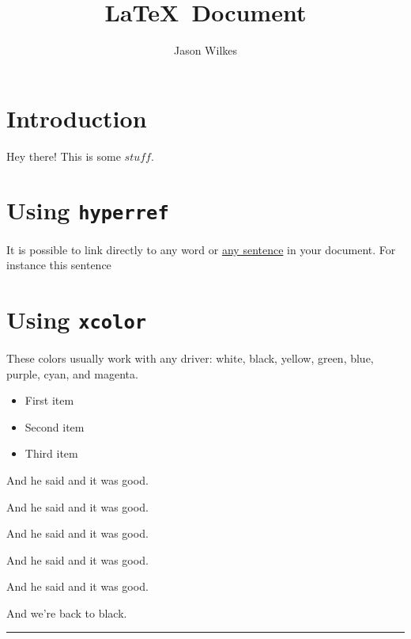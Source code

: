 \documentclass[12pt]{article}
\title{\LaTeX\ Document}
\author{Jason Wilkes}
\date{}
\def\ni{\noindent}
\DeclareRobustCommand{\stuff}{\ensuremath{\mathit{stuff}}}
\begin{document}
\maketitle


\section{Introduction}
Hey there! This is some \stuff.

\section{Using \texttt{hyperref}}
It is possible to link directly to any word or \hyperlink{mylink}{any sentence} in your document.
For instance \hypertarget{mylink}{this sentence}

\section{Using \texttt{xcolor}}
These colors usually work with any driver: white, black, yellow, green, blue, purple, cyan, and magenta.


\begin{itemize}
\color{blue} \item First item
\color{MyColor1}\item Second item
\color{MyColor2}\item Third item
\end{itemize}

\noindent
And he said {} and it was good.

\noindent
And he said {} and it was good.

\noindent
And he said {\fontsize{15pt}{15pt}\selectfont{}} and it was good.

\noindent
And he said {} and it was good.

\noindent
And he said {} and it was good.


\ni
And we're back to black.

\ni
{\color{red} \rule{\linewidth}{0.1em}}
\end{document}
